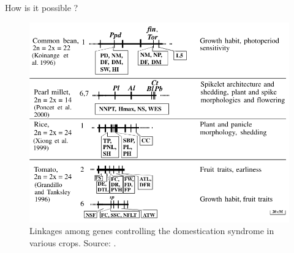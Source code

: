 \documentclass[11pt,ignorenonframetext,aspectratio=169]{beamer}
\begin{document}
\begin{frame}{How is it possible ?}
\protect\hypertarget{how-is-it-possible}{}
\begin{figure}
\includegraphics[width=0.62\linewidth]{./images/linkage_among_genes_domestication_syndrome} \caption{Linkages among genes controlling the domestication syndrome in various crops. Source: \cite{gepts2010crop}.}\label{fig:linkage-domestication-syndrome}
\end{figure}
\end{frame}
\end{document}
